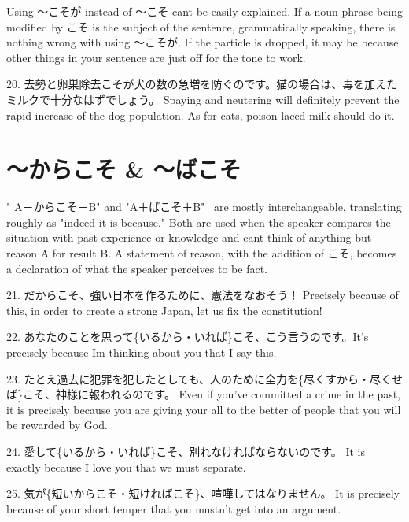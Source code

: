 \par{ Using ～こそが instead of ～こそ can\textquotesingle t be easily explained. If a noun phrase being modified by こそ is the subject of the sentence, grammatically speaking, there is nothing wrong with using ～こそが. If the particle is dropped, it may be because other things in your sentence are just off for the tone to work. }

\par{20. 去勢と卵巣除去こそが犬の数の急増を防ぐのです。猫の場合は、毒を加えたミルクで十分なはずでしょう。 \hfill\break
Spaying and neutering will definitely prevent the rapid increase of the dog population. As for cats, poison laced milk should do it. }
      
\section{～からこそ \& ～ばこそ}
 
\par{ " A＋からこそ＋B" and "A＋ばこそ＋B"  are mostly interchangeable, translating roughly as "indeed it is because." Both are used when the speaker compares the situation with past experience or knowledge and can\textquotesingle t think of anything but reason A for result B. A statement of reason, with the addition of こそ, becomes a declaration of what the speaker perceives to be fact. }

\par{21. だからこそ、強い日本を作るために、憲法をなおそう！ \hfill\break
Precisely because of this, in order to create a strong Japan, let us fix the constitution! }

\par{22. あなたのことを思って\{いるから・いれば\}こそ、こう言うのです。It's precisely because I\textquotesingle m thinking about you that I say this. }

\par{23. たとえ過去に犯罪を犯したとしても、人のために全力を\{尽くすから・尽くせば\}こそ、神様に報われるのです。 \hfill\break
Even if you've committed a crime in the past, it is precisely because you are giving your all to the better of people that you will be rewarded by God. }

\par{24. 愛して\{いるから・いれば\}こそ、別れなければならないのです。 \hfill\break
It is exactly because I love you that we must separate. }

\par{25. 気が\{短いからこそ・短ければこそ\}、喧嘩してはなりません。 \hfill\break
It is precisely because of your short temper that you mustn't get into an argument. }

